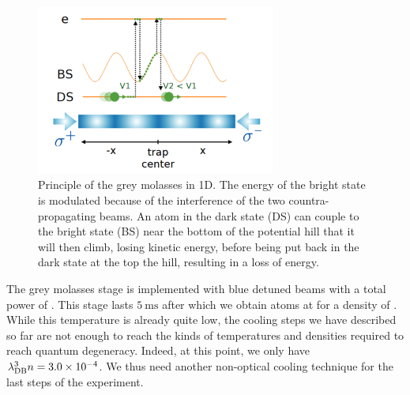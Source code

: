 \begin{figure}
    \centering
    \includegraphics[width=0.7\textwidth]{Fig/Chapter3/grey_molasses.png}
    \caption{Principle of the grey molasses in 1D. The energy of the bright state is modulated because of the interference of the two countra-propagating beams. An atom in the dark state (DS) can couple to the bright state (BS) near the bottom of the potential hill that it will then climb, losing kinetic energy, before being put back in the dark state at the top the hill, resulting in a loss of energy.}
    \label{fig:grey_molasses}
\end{figure}

The grey molasses stage is implemented with blue detuned  beams with a total power of . This stage lasts $5 \ \mathrm{ms}$ after which we obtain  atoms at  for a density of . While this temperature is already quite low, the cooling steps we have described so far are not enough to reach the kinds of temperatures and densities required to reach quantum degeneracy. Indeed, at this point, we only have $\lambda_{\rm{DB}}^3 n = 3.0 \times 10^{-4}$. We thus need another non-optical cooling technique for the last steps of the experiment.

